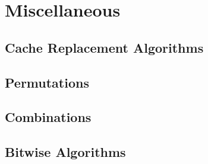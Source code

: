 \section{Miscellaneous}

\subsection{Cache Replacement Algorithms}

\subsection{Permutations}

\subsection{Combinations}

\subsection{Bitwise Algorithms}


